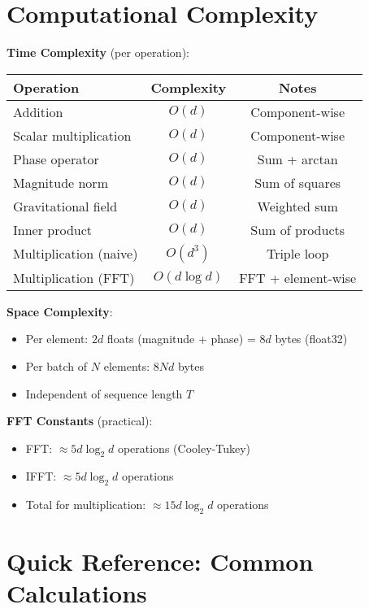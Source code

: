\section{Computational Complexity}

\begin{tcolorbox}[colback=red!5!white,colframe=red!75!black,title=Complexity Reference]

\textbf{Time Complexity} (per operation):
\begin{center}
\begin{tabular}{|l|c|c|}
\hline
Operation & Complexity & Notes \\
\hline
Addition & $O(d)$ & Component-wise \\
Scalar multiplication & $O(d)$ & Component-wise \\
Phase operator & $O(d)$ & Sum + arctan \\
Magnitude norm & $O(d)$ & Sum of squares \\
Gravitational field & $O(d)$ & Weighted sum \\
Inner product & $O(d)$ & Sum of products \\
Multiplication (naive) & $O(d^3)$ & Triple loop \\
Multiplication (FFT) & $O(d \log d)$ & FFT + element-wise \\
\hline
\end{tabular}
\end{center}

\textbf{Space Complexity}:
\begin{itemize}
\item Per element: $2d$ floats (magnitude + phase) = $8d$ bytes (float32)
\item Per batch of $N$ elements: $8Nd$ bytes
\item Independent of sequence length $T$
\end{itemize}

\textbf{FFT Constants} (practical):
\begin{itemize}
\item FFT: $\approx 5d \log_2 d$ operations (Cooley-Tukey)
\item IFFT: $\approx 5d \log_2 d$ operations
\item Total for multiplication: $\approx 15d \log_2 d$ operations
\end{itemize}

\end{tcolorbox}

\section{Quick Reference: Common Calculations}

